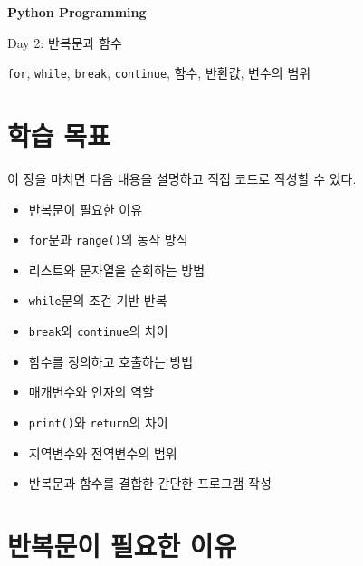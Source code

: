 \documentclass[11pt,a4paper]{article}
\begin{document}
\begin{titlepage}
    \centering
    \vspace*{3cm}

    {\Huge\bfseries Python Programming\par}
    \vspace{0.8cm}
    {\LARGE Day 2: 반복문과 함수\par}

    \vspace{2cm}

    {\large \texttt{for}, \texttt{while}, \texttt{break}, \texttt{continue}, 함수, 반환값, 변수의 범위\par}

    \vfill
\end{titlepage}

\tableofcontents
\newpage

\section{학습 목표}

\begin{learningbox}
이 장을 마치면 다음 내용을 설명하고 직접 코드로 작성할 수 있다.
\begin{itemize}[leftmargin=1.5em]
    \item 반복문이 필요한 이유
    \item \texttt{for}문과 \texttt{range()}의 동작 방식
    \item 리스트와 문자열을 순회하는 방법
    \item \texttt{while}문의 조건 기반 반복
    \item \texttt{break}와 \texttt{continue}의 차이
    \item 함수를 정의하고 호출하는 방법
    \item 매개변수와 인자의 역할
    \item \texttt{print()}와 \texttt{return}의 차이
    \item 지역변수와 전역변수의 범위
    \item 반복문과 함수를 결합한 간단한 프로그램 작성
\end{itemize}
\end{learningbox}

\section{반복문이 필요한 이유}
\end{document}
